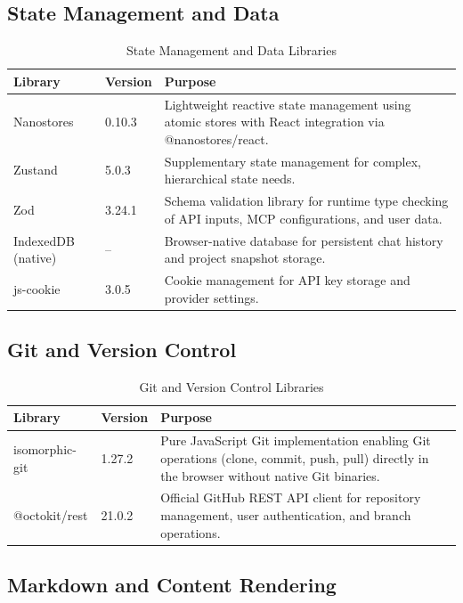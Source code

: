 \documentclass[12pt,a4paper,openany]{report}
\begin{document}
\subsection{State Management and Data}

\begin{table}[H]
\centering
\caption{State Management and Data Libraries}
\label{tab:state-libs}
\begin{tabular}{|p{3.5cm}|p{2cm}|p{6.5cm}|}
\hline
\textbf{Library} & \textbf{Version} & \textbf{Purpose} \\
\hline
Nanostores & 0.10.3 & Lightweight reactive state management using atomic stores with React integration via @nanostores/react. \\
\hline
Zustand & 5.0.3 & Supplementary state management for complex, hierarchical state needs. \\
\hline
Zod & 3.24.1 & Schema validation library for runtime type checking of API inputs, MCP configurations, and user data. \\
\hline
IndexedDB (native) & -- & Browser-native database for persistent chat history and project snapshot storage. \\
\hline
js-cookie & 3.0.5 & Cookie management for API key storage and provider settings. \\
\hline
\end{tabular}
\end{table}

\subsection{Git and Version Control}

\begin{table}[H]
\centering
\caption{Git and Version Control Libraries}
\label{tab:git-libs}
\begin{tabular}{|p{3.5cm}|p{2cm}|p{6.5cm}|}
\hline
\textbf{Library} & \textbf{Version} & \textbf{Purpose} \\
\hline
isomorphic-git & 1.27.2 & Pure JavaScript Git implementation enabling Git operations (clone, commit, push, pull) directly in the browser without native Git binaries. \\
\hline
@octokit/rest & 21.0.2 & Official GitHub REST API client for repository management, user authentication, and branch operations. \\
\hline
\end{tabular}
\end{table}

\subsection{Markdown and Content Rendering}
\end{document}
